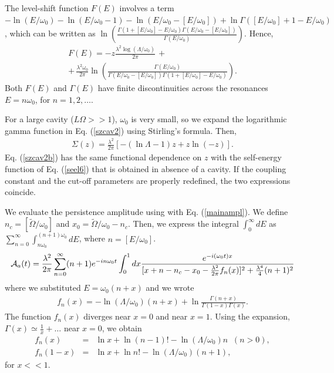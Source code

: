 \documentclass[12pt]{article}
\numberwithin{equation}{section}
\begin{document}
 The level-shift function $F(E)$ involves a term $ - \ln(E/\omega_0) -   \ln(E/\omega_0 - 1) - \ln(E/\omega_0 - [E/\omega_0]) + \ln \Gamma( [E/\omega_0] + 1 -  E/\omega_0)$, which can be written as
$ \ln \left( \frac{\Gamma(1+ [E/\omega_0] - E/\omega_0)   \Gamma(E/\omega_0 - [E/\omega_0]) }{ \Gamma(E/\omega_0) }\right)$. Hence,
  \begin{multline}
  F(E) =   - z \frac{\lambda^2\log (\Lambda/\omega_0) }{2\pi} \, + \\ 
  + \, \frac{\lambda^2\omega_0 }{2\pi} \ln \left( \frac{ \Gamma(E/\omega_0) }{ \Gamma(E/\omega_0 - [E/\omega_0])\Gamma(1+ [E/\omega_0] - E/\omega_0)  }\right).
  \end{multline}
  Both $F(E)$ and $\Gamma(E)$ have finite  discontinuities across the resonances $E = n \omega_0$, for $n = 1, 2, \ldots$.



\medskip

 For a large cavity ($L \Omega >>1$), $\omega_0$ is very small, so we expand the logarithmic gamma function in Eq. (\ref{szcav2}) using  Stirling's formula. Then,
\begin{eqnarray}
\Sigma(z) =   \frac{\lambda^2  }{2\pi}\left[ - ( \ln \Lambda - 1)z + z \ln(-z) \right] . \label{szcav2b}
\end{eqnarray}
Eq. (\ref{szcav2b}) has the same functional dependence on $z$ with the self-energy function of Eq. (\ref{seel6})   that is obtained in absence of a cavity. If the coupling constant and the cut-off parameters are properly redefined, the two expressions coincide.

\medskip

We evaluate the persistence amplitude using with Eq. (\ref{mainampl}). We define $n_c = [\tilde{\Omega}/\omega_0] $ and $x_0 = \tilde{\Omega}/\omega_0 - n_c $. Then, we express the integral $\int_0^{\infty} dE$   as $\sum_{n=0}^{\infty} \int_{n \omega_0}^{(n+1)\omega_0}dE$, where $n = [E/\omega_0]$.
\begin{eqnarray}
{\cal A}_a(t) = \frac{\lambda^2  }{2 \pi} \sum_{n=0}^{\infty}(n+1)e^{-i n \omega_0 t} \int_0^1 dx \frac{e^{-i(\omega_0t)x}}{[x + n - n_c - x_0 - \frac{\lambda^2 }{2\pi} f_n(x)]^2 + \frac{\lambda^4 }{4}(n+1)^2 } \label{offres}
\end{eqnarray}
 where we substituted $ E = \omega_0(n+x)$ and we wrote
\begin{eqnarray}
f_n(x) =   - \ln(\Lambda/\omega_0) (n +x)  + \ln \frac{ \Gamma(n+x)}{\Gamma(1-x)\Gamma(x)}.
\end{eqnarray}
The function $f_n(x)$ diverges near $x = 0$ and near $x = 1$. Using the expansion,  $\Gamma(x) \simeq \frac{1}{x}  + \ldots$ near $x = 0$, we obtain
\begin{eqnarray}
f_n(x) &=&   \ln x  + \ln (n-1)! -   \ln(\Lambda/\omega_0) n \; \; (n > 0), \label{fn0}
\\ f_n(1-x) &=& \ln x + \ln n! -   \ln(\Lambda/\omega_0) (n+1), \label{fn1}
\end{eqnarray}
for $x << 1$.
\end{document}
